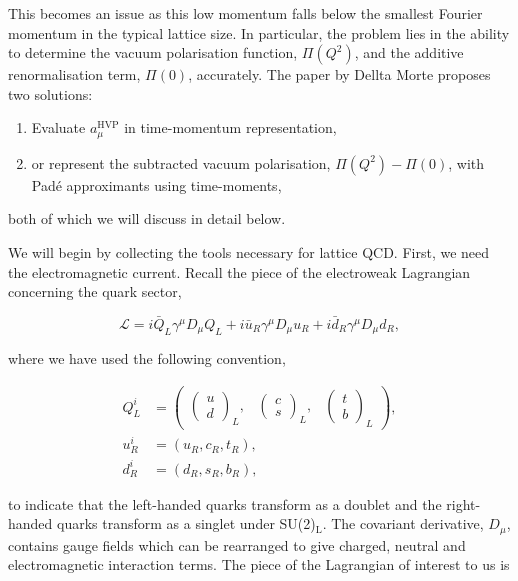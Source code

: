 \documentclass{article}
\numberwithin{equation}{section} %
\begin{document}
This becomes an issue as this low momentum falls below the smallest Fourier momentum in the typical lattice size. In particular, the problem lies in the ability to determine the vacuum polarisation function, $\Pi(Q^2)$, and the additive renormalisation term, $\Pi(0)$, accurately\cite{dellamorte}. The paper by Dellta Morte\cite{dellamorte} proposes two solutions: 


\begin{enumerate}
\item Evaluate $a_\mu^\mathrm{HVP}$ in time-momentum representation,
\item or represent the subtracted vacuum polarisation, $\Pi(Q^2)-\Pi(0)$, with Pad\'{e} approximants using time-moments,
\end{enumerate}

\noindent both of which we will discuss in detail below. 

We will begin by collecting the tools necessary for lattice QCD. First, we need the electromagnetic current. Recall the piece of the electroweak Lagrangian concerning the quark sector,

\begin{equation}
\mathcal{L}=i\bar{Q}_L\gamma^\mu D_\mu Q_L + i\bar{u}_R\gamma^\mu D_\mu u_R + i\bar{d}_R\gamma^\mu D_\mu d_R,
\label{ewqLagr}
\end{equation}

\noindent where we have used the following convention\cite{sm},

\begin{equation}
\begin{split}
Q_L^i&=\begin{pmatrix}
\begin{pmatrix}
u\\d
\end{pmatrix}_L, & \begin{pmatrix}
c\\s
\end{pmatrix}_L, & \begin{pmatrix}
t\\b
\end{pmatrix}_L
\end{pmatrix},\\
u^i_R&=(u_R	,c_R,t_R),\\
d^i_R&=(d_R,s_R,b_R),
\end{split}
\end{equation}

\noindent to indicate that the left-handed quarks transform as a doublet and the right-handed quarks transform as a singlet under SU(2)$_\mathrm{L}$. The covariant derivative, $D_\mu$, contains gauge fields which can be rearranged to give charged, neutral and electromagnetic interaction terms. The piece of the Lagrangian of interest to us is
\end{document}
